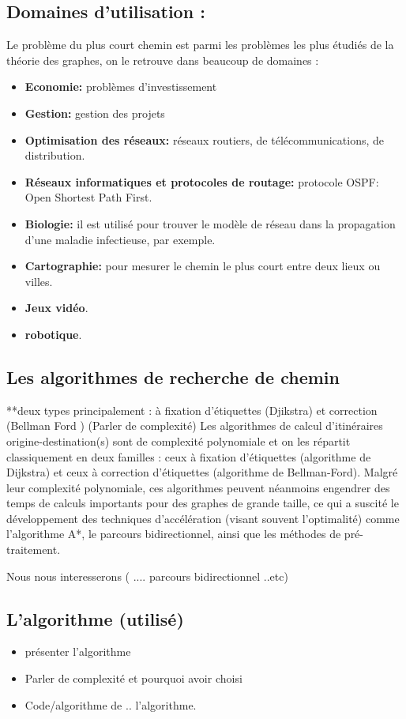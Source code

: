 \subsection{Domaines d'utilisation :}
Le problème du plus court chemin est parmi les problèmes les plus étudiés de la théorie des graphes, on le retrouve dans beaucoup de domaines :
\begin{itemize}
\item\textbf{Economie:} problèmes d’investissement
\item\textbf{Gestion:} gestion des projets
\item\textbf{Optimisation des réseaux:} réseaux routiers, de télécommunications, de distribution.
\item\textbf{Réseaux informatiques et protocoles de routage:}   protocole OSPF: Open Shortest Path First.
\item\textbf{Biologie:} il est utilisé pour trouver le modèle de réseau dans la propagation d'une maladie infectieuse, par exemple.
\item\textbf{Cartographie:} pour mesurer le chemin le plus court entre deux lieux ou villes.
\item\textbf{Jeux vidéo}.
\item\textbf{robotique}.
\end{itemize}

\subsection{Les algorithmes de recherche de chemin}
**deux types principalement : à fixation d'étiquettes (Djikstra) et correction  (Bellman Ford ) \newline
(Parler de complexité) \newline
Les algorithmes de calcul d'itinéraires origine-destination(s) sont de complexité polynomiale et on les répartit classiquement en deux familles : ceux à fixation d'étiquettes (algorithme de Dijkstra) et ceux à correction d'étiquettes (algorithme de Bellman-Ford).
Malgré leur complexité polynomiale, ces algorithmes peuvent néanmoins engendrer des temps de calculs importants pour des graphes de grande taille, ce qui a suscité le développement des techniques d'accélération (visant souvent l'optimalité) comme l'algorithme A*, le parcours bidirectionnel, ainsi que les méthodes de pré-traitement.

Nous nous interesserons ( .... parcours bidirectionnel ..etc) 

\subsection{L'algorithme (utilisé)}
\begin{itemize}
\item présenter l'algorithme
\item Parler de complexité et pourquoi avoir choisi
\item Code/algorithme de .. l'algorithme.
\end{itemize}

